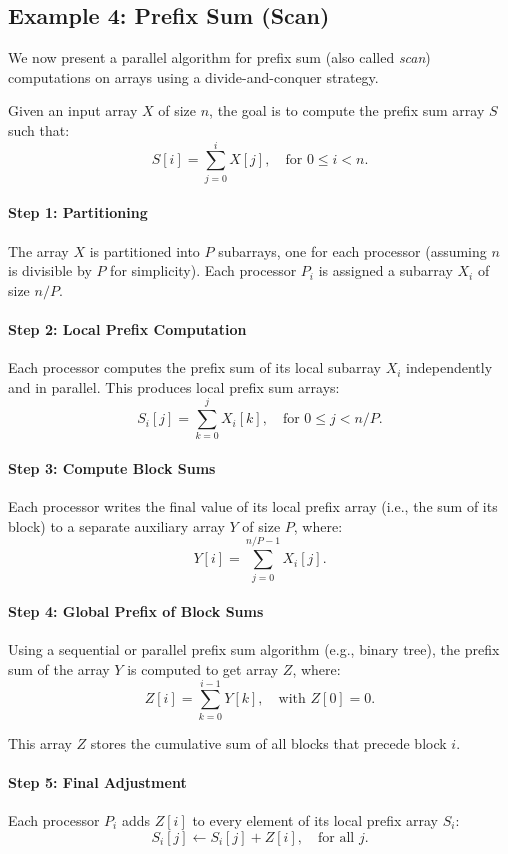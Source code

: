 \documentclass[12pt]{book}
\begin{document}
\subsection{Example 4: Prefix Sum (Scan)}
We now present a parallel algorithm for prefix sum (also called \textit{scan}) computations on arrays using a divide-and-conquer strategy.

Given an input array $X$ of size $n$, the goal is to compute the prefix sum array $S$ such that:
\[
S[i] = \sum_{j=0}^{i} X[j], \quad \text{for } 0 \leq i < n.
\]

\paragraph{Step 1: Partitioning}
The array $X$ is partitioned into $P$ subarrays, one for each processor (assuming $n$ is divisible by $P$ for simplicity). Each processor $P_i$ is assigned a subarray $X_i$ of size $n/P$.

\paragraph{Step 2: Local Prefix Computation}
Each processor computes the prefix sum of its local subarray $X_i$ independently and in parallel. This produces local prefix sum arrays:
\[
S_i[j] = \sum_{k=0}^{j} X_i[k], \quad \text{for } 0 \leq j < n/P.
\]

\paragraph{Step 3: Compute Block Sums}
Each processor writes the final value of its local prefix array (i.e., the sum of its block) to a separate auxiliary array $Y$ of size $P$, where:
\[
Y[i] = \sum_{j=0}^{n/P - 1} X_i[j].
\]

\paragraph{Step 4: Global Prefix of Block Sums}
Using a sequential or parallel prefix sum algorithm (e.g., binary tree), the prefix sum of the array $Y$ is computed to get array $Z$, where:
\[
Z[i] = \sum_{k=0}^{i-1} Y[k], \quad \text{with } Z[0] = 0.
\]

This array $Z$ stores the cumulative sum of all blocks that precede block $i$.

\paragraph{Step 5: Final Adjustment}
Each processor $P_i$ adds $Z[i]$ to every element of its local prefix array $S_i$:
\[
S_i[j] \gets S_i[j] + Z[i], \quad \text{for all } j.
\]
\end{document}
